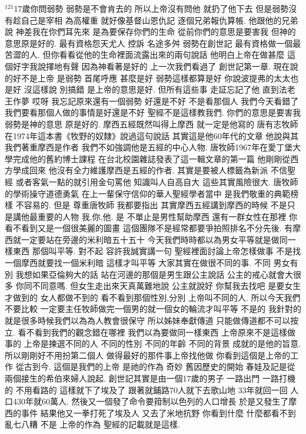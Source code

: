 \documentclass{book}
\begin{document}
$^{121}$17歲你問弱勢 弱勢是不會肯去的 所以上帝沒有問他 就扔了他下去 但是弱勢沒有趁自己是宰相 為高權重 就好像基督山恩仇記 逐個兄弟報仇算帳.
他跟他的兄弟說 神差我在你們耳先來 是為要保存你們的生命 從前你們的意思是要害我 但神的意思原是好的.
最有資格怨天尤人 控訴 名途多舛 弱勢在創世記 最有資格做一個最苦澀的人.
但你看看從他的生命裡面流露出來的兩句說話 他明白上帝在做甚麼 這個好字我說擇地有聲 因為神看著是好的 上一次我們看過了 創世記第一章.
現在說的好不是上帝 是弱勢 首尾呼應 甚麼是好 弱勢這樣都算是好 你說波提弗的太太也是好 沒這樣說 別搞錯 是上帝的意思是好.
但所有這些事 走証忘記了他 直到法老王作夢 哎呀 我忘記原來還有一個弱勢 好還是不好 不是看那個人 我們今天看錯了 我們要看那個人做的事情是好還是不好 聖經不是這樣教我們.
你們的意思是要害我 弱勢是神的意思 原是好的.
摩西五經既然叫得上摩西 就一定是他寫的 唐有志牧師在1974年這本書《牧野的奴隸》說過這句說話 其實這是他60年代的文章 他說與其我們著重摩西是作者 我們不如強調他是五經的中心人物.
唐牧師1967年在愛丁堡大學完成他的舊約博士課程 在台北校園雜誌發表了這一輯文章的第一篇 他剛剛從西方學成回來 他沒有全力維護摩西是五經的作者.
其實是要被人標籤為新派 不信聖經 或者客氣一點的就引用金句罵他 知識叫人自高自大 這些其實風險很大.
唐牧師的學術操守道德勇氣 在上一輩保守信仰的華人聖經學者當中 是我們敬重的典範榜樣 不容易的.
但是 尊重唐牧師 我都要指出 其實摩西五經講到摩西的時候 不是只是講他最重要的人物 我,你,他.
是 不單止是男性幫助摩西 還有一群女性在那裡 你看不看到又是一個很美麗的圖畫 這個團隊不是經常都要爭拍照排名不分先後.
有摩西就一定要站在旁邊的米利暗五十五十 今天我們時時都以為男女平等就是做同一樣東西 那個叫平等.
對不起 容許我誠實講一句 聖經裡面討論上帝怎樣做事 不是找一個摩西就要找一個米利暗 這樣才叫平等 大家其實在做很不同的事.
不同 男女有別 我想如果亞倫夠大的話 站在河邊的那個是男生跟公主說話 公主的戒心就會大很多 你同不同意嗎.
但女生走出來天真萬難地說 公主就說好 你幫我去找吧 是要女生才做到的 女人都做不到的 看不看到那個性別,分別 上帝叫不同的人.
所以今天我們不要比較 一定要主任牧師做完一個男的就一個女的輪流才叫平等 不是的 我針對的就是很多時候我們以為為人教會很保守 所以姊妹奉獻傳道 只能做傳道都不可以按立.
看不看到我們的觀念錯在哪裡 我們以為要做同一樣東西 上帝原來不是這樣做事的 上帝是揀選不同的人 不同的性別 不同的年齡 不同的背景 成就的是他的旨意.
所以剛剛好不用扮第二個人 做得最好的那件事上帝找他做 你看到這個是上帝的工作 從古到今.
這個是我們的上帝 是祂的作為 奇妙 舊因歷史的開始 春娃及記是從兩個接生的希伯來婦人說起.
創世記其實是由一個17歲的男子 一路出門 一路打機的 不用看路的 這樣就下了埃及了 跟著就鋪路70人就下去歌山地 33年就回一回 人口430年就60萬人.
然後又一個發了命令要箝制以色列的人口增長 於是又發生了摩西的事件 結果他又一拳打死了埃及人 又去了米地抗野 你看到什麼 什麼都看不到 亂七八糟 不是 上帝的作為 聖經的記載就是這樣.
\end{document}

